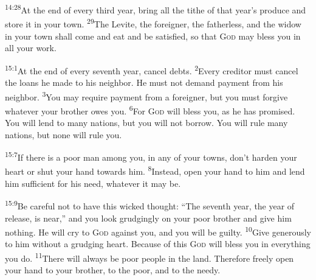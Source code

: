 \documentclass[openany,12pt,english]{book}
\newenvironment{para}{\par\pretolerance=100\tolerance=200\setlength{\emergencystretch}{0.6em}\relax}{\par}
\begin{document}
\begin{para}
    \textsuperscript{14:28}\thinspace{}At the end of eve\-ry third year, bring all the tithe of that year's pro\-duce and store it in your town.
    \textsuperscript{29}\thinspace{}The Levite, the for\-eign\-er, the fa\-ther\-less, and the wid\-ow in your town shall come and eat and be sat\-is\-fied, so that \textsc{God} may bless you in all your work.
\end{para}

\bigskip{}

\begin{para}
    \textsuperscript{15:1}\thinspace{}At the end of eve\-ry sev\-enth year, can\-cel debts.
    \textsuperscript{2}\thinspace{}Eve\-ry cred\-i\-tor must can\-cel the loans he made to his neigh\-bor. He must not de\-mand pay\-ment from his neigh\-bor.
    \textsuperscript{3}\thinspace{}You may re\-quire pay\-ment from a for\-eign\-er, but you must for\-give what\-ev\-er your broth\-er owes you.
    \textsuperscript{6}\thinspace{}For \textsc{God} will bless you, as he has prom\-ised. You will lend to man\-y nations, but you will not bor\-row. You will rule man\-y nations, but none will rule you.
\end{para}

\begin{para}
    \textsuperscript{15:7}\thinspace{}If there is a poor man a\-mong you, in any of your towns, don't hard\-en your heart or shut your hand to\-wards him.
    \textsuperscript{8}\thinspace{}In\-stead, o\-pen your hand to him and lend him suf\-fi\-cient for his need, what\-ev\-er it may be.
\end{para}

\begin{para}
    \textsuperscript{15:9}\thinspace{}Be care\-ful not to have this wick\-ed thought: “The sev\-enth year, the year of re\-lease, is near,” and you look grudg\-ing\-ly on your poor broth\-er and give him noth\-ing. He will cry to \textsc{God} against you, and you will be guilt\-y.
    \textsuperscript{10}\thinspace{}Give gen\-er\-ous\-ly to him with\-out a grudg\-ing heart. Be\-cause of this \textsc{God} will bless you in eve\-ry\-thing you do.
    \textsuperscript{11}\thinspace{}There will al\-ways be poor peo\-ple in the land. There\-fore free\-ly o\-pen your hand to your broth\-er, to the poor, and to the needy.
\end{para}
\end{document}
